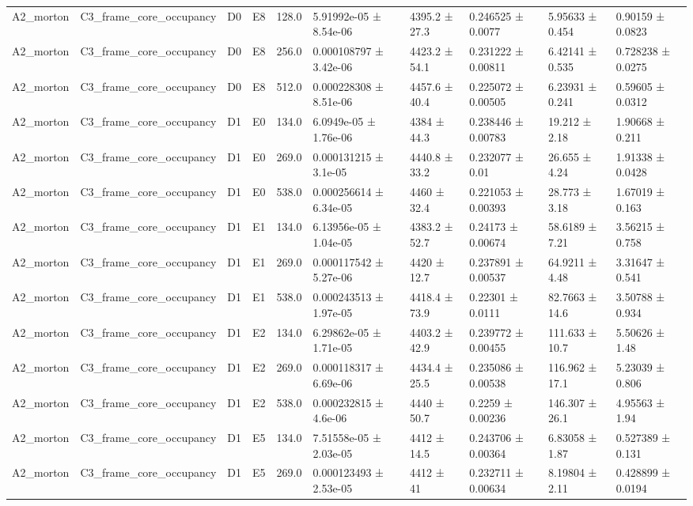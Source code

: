 \begin{table}
\begin{tabular}{llllllllll}
A2\_morton & C3\_frame\_core\_occupancy & D0 & E8 & 128.0 & 5.91992e-05 ± 8.54e-06 & 4395.2 ± 27.3 & 0.246525 ± 0.0077 & 5.95633 ± 0.454 & 0.90159 ± 0.0823 \\
A2\_morton & C3\_frame\_core\_occupancy & D0 & E8 & 256.0 & 0.000108797 ± 3.42e-06 & 4423.2 ± 54.1 & 0.231222 ± 0.00811 & 6.42141 ± 0.535 & 0.728238 ± 0.0275 \\
A2\_morton & C3\_frame\_core\_occupancy & D0 & E8 & 512.0 & 0.000228308 ± 8.51e-06 & 4457.6 ± 40.4 & 0.225072 ± 0.00505 & 6.23931 ± 0.241 & 0.59605 ± 0.0312 \\
A2\_morton & C3\_frame\_core\_occupancy & D1 & E0 & 134.0 & 6.0949e-05 ± 1.76e-06 & 4384 ± 44.3 & 0.238446 ± 0.00783 & 19.212 ± 2.18 & 1.90668 ± 0.211 \\
A2\_morton & C3\_frame\_core\_occupancy & D1 & E0 & 269.0 & 0.000131215 ± 3.1e-05 & 4440.8 ± 33.2 & 0.232077 ± 0.01 & 26.655 ± 4.24 & 1.91338 ± 0.0428 \\
A2\_morton & C3\_frame\_core\_occupancy & D1 & E0 & 538.0 & 0.000256614 ± 6.34e-05 & 4460 ± 32.4 & 0.221053 ± 0.00393 & 28.773 ± 3.18 & 1.67019 ± 0.163 \\
A2\_morton & C3\_frame\_core\_occupancy & D1 & E1 & 134.0 & 6.13956e-05 ± 1.04e-05 & 4383.2 ± 52.7 & 0.24173 ± 0.00674 & 58.6189 ± 7.21 & 3.56215 ± 0.758 \\
A2\_morton & C3\_frame\_core\_occupancy & D1 & E1 & 269.0 & 0.000117542 ± 5.27e-06 & 4420 ± 12.7 & 0.237891 ± 0.00537 & 64.9211 ± 4.48 & 3.31647 ± 0.541 \\
A2\_morton & C3\_frame\_core\_occupancy & D1 & E1 & 538.0 & 0.000243513 ± 1.97e-05 & 4418.4 ± 73.9 & 0.22301 ± 0.0111 & 82.7663 ± 14.6 & 3.50788 ± 0.934 \\
A2\_morton & C3\_frame\_core\_occupancy & D1 & E2 & 134.0 & 6.29862e-05 ± 1.71e-05 & 4403.2 ± 42.9 & 0.239772 ± 0.00455 & 111.633 ± 10.7 & 5.50626 ± 1.48 \\
A2\_morton & C3\_frame\_core\_occupancy & D1 & E2 & 269.0 & 0.000118317 ± 6.69e-06 & 4434.4 ± 25.5 & 0.235086 ± 0.00538 & 116.962 ± 17.1 & 5.23039 ± 0.806 \\
A2\_morton & C3\_frame\_core\_occupancy & D1 & E2 & 538.0 & 0.000232815 ± 4.6e-06 & 4440 ± 50.7 & 0.2259 ± 0.00236 & 146.307 ± 26.1 & 4.95563 ± 1.94 \\
A2\_morton & C3\_frame\_core\_occupancy & D1 & E5 & 134.0 & 7.51558e-05 ± 2.03e-05 & 4412 ± 14.5 & 0.243706 ± 0.00364 & 6.83058 ± 1.87 & 0.527389 ± 0.131 \\
A2\_morton & C3\_frame\_core\_occupancy & D1 & E5 & 269.0 & 0.000123493 ± 2.53e-05 & 4412 ± 41 & 0.232711 ± 0.00634 & 8.19804 ± 2.11 & 0.428899 ± 0.0194 \\

\end{tabular}
\end{table}
